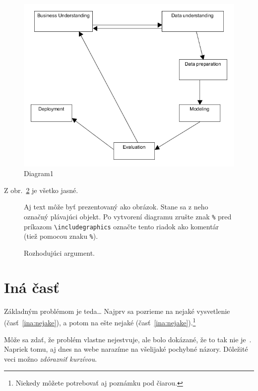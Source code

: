 \documentclass[10pt,twocolumn,twoside,slovak,a4paper]{article}
\begin{document}
\begin{figure}[h!]
\includegraphics[width=2\linewidth]{diagram1.png}
  \caption{ Diagram1}
  \label{fig:Diagram1}
\end{figure}

Z obr.~\ref{f:rozhod} je všetko jasné. 

\begin{figure}[tbh]
\centering
Aj text môže byť prezentovaný ako obrázok. Stane sa z neho označný plávajúci objekt. Po vytvorení diagramu zrušte znak \texttt{\%} pred príkazom \verb|\includegraphics| označte tento riadok ako komentár (tiež pomocou znaku \texttt{\%}).
\caption{Rozhodujúci argument.}
\label{f:rozhod}
\end{figure}



\section{Iná časť} \label{ina}

Základným problémom je teda\ldots{} Najprv sa pozrieme na nejaké vysvetlenie (časť~\ref{ina:nejake}), a potom na ešte nejaké (časť~\ref{ina:nejake}).\footnote{Niekedy môžete potrebovať aj poznámku pod čiarou.}

Môže sa zdať, že problém vlastne nejestvuje\cite{Coplien:MPD}, ale bolo dokázané, že to tak nie je~\cite{Czarnecki:Staged, Czarnecki:Progress}. Napriek tomu, aj dnes na webe narazíme na všelijaké pochybné názory\cite{PLP-Framework}. Dôležité veci možno \emph{zdôrazniť kurzívou}.
\end{document}
